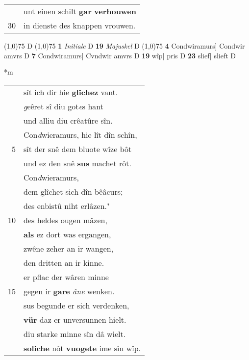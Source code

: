\documentclass[8pt,a4paper,notitlepage]{article}
\begin{document}
\begin{table}[ht]
\begin{minipage}[t]{0.5\linewidth}
\begin{tabular}{rl}
 & unt einen schilt \textbf{gar} \textbf{verhouwen}\\ 
30 & in dienste des knappen vrouwen.\\ 
\end{tabular}
\scriptsize
\line(1,0){75} \newline
D \newline
\line(1,0){75} \newline
\textbf{1} \textit{Initiale} D  \textbf{19} \textit{Majuskel} D  \newline
\line(1,0){75} \newline
\textbf{4} Condwiramurs] Condwir amvrs D \textbf{7} Condwiramurs] Cvndwir amvrs D \textbf{19} wîp] pris D \textbf{23} slief] slieft D \newline
\end{minipage}
\hspace{0.5cm}
\begin{minipage}[t]{0.5\linewidth}
\small
\begin{center}*m
\end{center}
\begin{tabular}{rl}
 & sît ich dir hie \textbf{glîchez} vant.\\ 
 & \textit{g}eêret sî diu got\textit{e}s hant\\ 
 & und alliu diu crêatûre sîn.\\ 
 & Con\textit{d}wieramurs, hie lît dîn schîn,\\ 
5 & sît der snê dem bluote wîze bôt\\ 
 & und ez den snê \textbf{sus} machet rôt.\\ 
 & Con\textit{d}wieramurs,\\ 
 & dem glîchet sich dîn bêâcurs;\\ 
 & des enbistû niht erlâzen."\\ 
10 & des heldes ougen mâzen,\\ 
 & \textbf{als} ez dort was ergangen,\\ 
 & zwêne zeher an ir wangen,\\ 
 & den dritten an ir kinne.\\ 
 & er pflac der wâren minne\\ 
15 & gegen ir \textbf{gare} \textit{âne} wenken.\\ 
 & sus begunde er sich verdenken,\\ 
 & \textbf{vür} daz er unversunnen hielt.\\ 
 & diu starke minne sîn dâ wielt.\\ 
 & \textbf{soliche} nôt \textbf{vuogete} ime sîn wîp.\\ 

\end{tabular}
\end{minipage}
\end{table}
\end{document}
